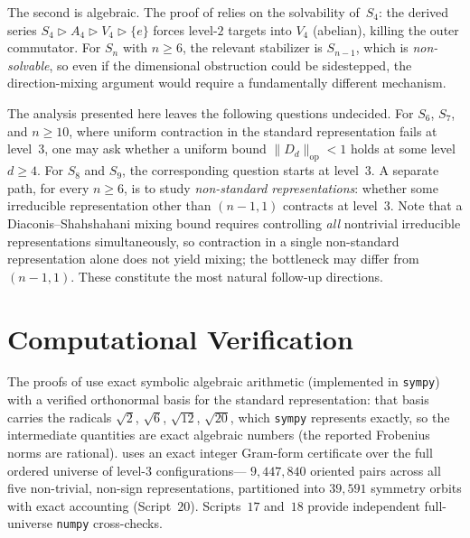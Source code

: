 \documentclass[version=final]{iacrcc}
\newcommand{\norm}[1]{\lVert #1 \rVert}
\newcommand{\opn}[1]{\norm{#1}_{\mathrm{op}}}
\newcommand{\Dhat}{\widehat{D}}
\begin{document}
The second is algebraic. The proof of  relies on the
solvability of~$S_4$: the derived series $S_4 \rhd A_4 \rhd V_4 \rhd \{e\}$
forces level-$2$ targets into $V_4$ (abelian), killing the outer commutator.
For $S_n$ with $n \geq 6$, the relevant stabilizer is $S_{n-1}$, which is
\emph{non-solvable}, so even if the dimensional obstruction could be
sidestepped, the direction-mixing argument would require a fundamentally
different mechanism.

The analysis presented here leaves the following questions undecided.
For $S_6$, $S_7$, and $n \geq 10$, where uniform contraction in the standard
representation fails at level~$3$, one may ask whether a uniform bound
$\opn{\Dhat_d} < 1$ holds at some level $d \geq 4$. For $S_8$ and $S_9$,
the corresponding question starts at level~$3$. A separate path, for
every $n \geq 6$, is to study \emph{non-standard representations}: whether some
irreducible representation other than $(n-1,1)$ contracts at level~$3$. Note that a
Diaconis--Shahshahani mixing bound requires controlling \emph{all} nontrivial
irreducible representations simultaneously, so contraction in a single
non-standard representation alone does not yield mixing; the bottleneck may
differ from $(n-1,1)$. These constitute the most natural follow-up directions.


\section{Computational Verification}
\label{sec:computation}

The proofs of  use exact symbolic algebraic
arithmetic (implemented in \texttt{sympy}) with a verified orthonormal basis for
the standard representation: that basis carries the radicals $\sqrt{2}$,
$\sqrt{6}$, $\sqrt{12}$, $\sqrt{20}$, which \texttt{sympy} represents exactly, so
the intermediate quantities are exact algebraic numbers (the reported Frobenius
norms are rational).  uses an exact integer Gram-form
certificate over the full ordered universe of level-$3$ configurations---
$9{,}447{,}840$ oriented pairs across all five non-trivial, non-sign
representations, partitioned into $39{,}591$ symmetry orbits with exact accounting
(Script~$20$). Scripts~$17$ and~$18$ provide independent full-universe
\texttt{numpy} cross-checks.
\end{document}
